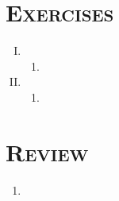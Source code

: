 \documentclass[12pt]{article}
\begin{document}
\section{\textsc{Exercises}}
\begin{enumerate}[I.]
	\setlength{\itemsep}{1em}
	\item \begin{enumerate}[1)]
		\item
	\end{enumerate}
	\item \begin{enumerate}[1)]
		\item
	\end{enumerate}
\end{enumerate}

\section{\textsc{Review}}
\begin{enumerate}[1.]
	\item
\end{enumerate}
\end{document}
